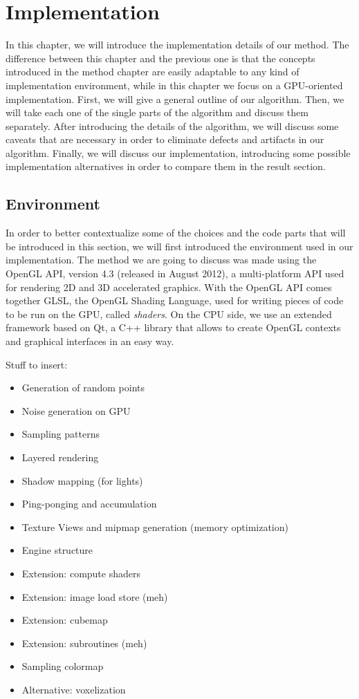 \chapter{Implementation}

In this chapter, we will introduce the implementation details of our method. The difference between this chapter and the previous one is that the concepts introduced in the method chapter are easily adaptable to any kind of implementation environment, while in this chapter we focus on a GPU-oriented implementation. First, we will give a general outline of our algorithm. Then, we will take each one of the single parts of the algorithm and discuss them separately. After introducing the details of the algorithm, we will discuss some caveats that are necessary in order to eliminate defects and artifacts in our algorithm. Finally, we will discuss our implementation, introducing some possible implementation alternatives in order to compare them in the result section.

\section{Environment}

In order to better contextualize some of the choices and the code parts that will be introduced in this section, we will first introduced the environment used in our implementation. The method we are going to discuss was made using the OpenGL API, version 4.3 (released in August 2012), a multi-platform API used for rendering 2D and 3D accelerated graphics. With the OpenGL API comes together GLSL, the OpenGL Shading Language, used for writing pieces of code to be run on the GPU, called \emph{shaders}. On the CPU side, we use an extended framework based on Qt, a C++ library that allows to create OpenGL contexts and graphical interfaces in an easy way.


Stuff to insert:
\begin{itemize}
	\item Generation of random points
	\item Noise generation on GPU
	\item Sampling patterns
	\item Layered rendering
	\item Shadow mapping (for lights)
	\item Ping-ponging and accumulation
	\item Texture Views and mipmap generation (memory optimization)
	\item Engine structure
	\item Extension: compute shaders
	\item Extension: image load store (meh)
	\item Extension: cubemap
	\item Extension: subroutines (meh)
	\item Sampling colormap
	\item Alternative: voxelization

\end{itemize}

